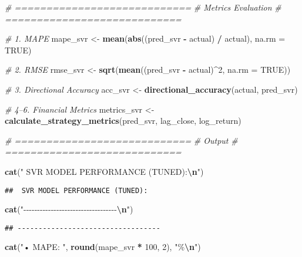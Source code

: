 \documentclass[
]{article}
\newenvironment{Shaded}{\begin{snugshade}}{\end{snugshade}}
\newcommand{\AttributeTok}[1]{\textcolor[rgb]{0.13,0.29,0.53}{#1}}
\newcommand{\CommentTok}[1]{\textcolor[rgb]{0.56,0.35,0.01}{\textit{#1}}}
\newcommand{\ConstantTok}[1]{\textcolor[rgb]{0.56,0.35,0.01}{#1}}
\newcommand{\DecValTok}[1]{\textcolor[rgb]{0.00,0.00,0.81}{#1}}
\newcommand{\FunctionTok}[1]{\textcolor[rgb]{0.13,0.29,0.53}{\textbf{#1}}}
\newcommand{\NormalTok}[1]{#1}
\newcommand{\OtherTok}[1]{\textcolor[rgb]{0.56,0.35,0.01}{#1}}
\newcommand{\SpecialCharTok}[1]{\textcolor[rgb]{0.81,0.36,0.00}{\textbf{#1}}}
\newcommand{\StringTok}[1]{\textcolor[rgb]{0.31,0.60,0.02}{#1}}
\begin{document}
\begin{Shaded}
\begin{Highlighting}[]
\CommentTok{\# ============================}
\CommentTok{\#  Metrics Evaluation}
\CommentTok{\# ============================}

\CommentTok{\# 1. MAPE}
\NormalTok{mape\_svr }\OtherTok{\textless{}{-}} \FunctionTok{mean}\NormalTok{(}\FunctionTok{abs}\NormalTok{((pred\_svr }\SpecialCharTok{{-}}\NormalTok{ actual) }\SpecialCharTok{/}\NormalTok{ actual), }\AttributeTok{na.rm =} \ConstantTok{TRUE}\NormalTok{)}

\CommentTok{\# 2. RMSE}
\NormalTok{rmse\_svr }\OtherTok{\textless{}{-}} \FunctionTok{sqrt}\NormalTok{(}\FunctionTok{mean}\NormalTok{((pred\_svr }\SpecialCharTok{{-}}\NormalTok{ actual)}\SpecialCharTok{\^{}}\DecValTok{2}\NormalTok{, }\AttributeTok{na.rm =} \ConstantTok{TRUE}\NormalTok{))}

\CommentTok{\# 3. Directional Accuracy}
\NormalTok{acc\_svr }\OtherTok{\textless{}{-}} \FunctionTok{directional\_accuracy}\NormalTok{(actual, pred\_svr)}

\CommentTok{\# 4–6. Financial Metrics}
\NormalTok{metrics\_svr }\OtherTok{\textless{}{-}} \FunctionTok{calculate\_strategy\_metrics}\NormalTok{(pred\_svr, lag\_close, log\_return)}

\CommentTok{\# ============================}
\CommentTok{\# Output}
\CommentTok{\# ============================}

\FunctionTok{cat}\NormalTok{(}\StringTok{" SVR MODEL PERFORMANCE (TUNED):}\SpecialCharTok{\textbackslash{}n}\StringTok{"}\NormalTok{)}
\end{Highlighting}
\end{Shaded}

\begin{verbatim}
##  SVR MODEL PERFORMANCE (TUNED):
\end{verbatim}

\begin{Shaded}
\begin{Highlighting}[]
\FunctionTok{cat}\NormalTok{(}\StringTok{"{-}{-}{-}{-}{-}{-}{-}{-}{-}{-}{-}{-}{-}{-}{-}{-}{-}{-}{-}{-}{-}{-}{-}{-}{-}{-}{-}{-}{-}{-}{-}{-}{-}{-}}\SpecialCharTok{\textbackslash{}n}\StringTok{"}\NormalTok{)}
\end{Highlighting}
\end{Shaded}

\begin{verbatim}
## ----------------------------------
\end{verbatim}

\begin{Shaded}
\begin{Highlighting}[]
\FunctionTok{cat}\NormalTok{(}\StringTok{"• MAPE:              "}\NormalTok{, }\FunctionTok{round}\NormalTok{(mape\_svr }\SpecialCharTok{*} \DecValTok{100}\NormalTok{, }\DecValTok{2}\NormalTok{), }\StringTok{"\%}\SpecialCharTok{\textbackslash{}n}\StringTok{"}\NormalTok{)}
\end{Highlighting}
\end{Shaded}
\end{document}

